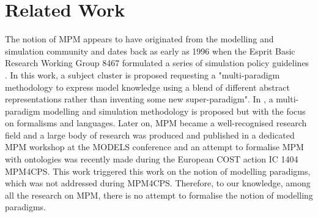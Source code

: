 \section{Related Work}
\label{sec:RelatedWork}

The notion of MPM appears to have originated from the modelling and simulation community and dates back as early as 1996 when the Esprit Basic Research Working Group 8467 formulated a series of simulation policy guidelines \cite{Vangheluwe-VansteenkisteKerckhoffs-1996}. In this work, a subject cluster is proposed requesting a "multi-paradigm methodology to express model knowledge using a blend of different abstract representations rather than inventing some new super-paradigm". In \cite{Vangheluwe-Vansteenkiste1996}, a multi-paradigm modelling and simulation methodology is proposed but with the focus on formalisms and languages. Later on, MPM became a well-recognised research field and a large body of research was produced and published in a dedicated MPM workshop at the MODELS conference and an attempt to formalise MPM with ontologies was recently made during the European COST action IC 1404 MPM4CPS. This work triggered this work on the notion of modelling paradigms, which was not addressed during MPM4CPS. Therefore, to our knowledge, among all the research on MPM, there is no attempt to formalise the notion of modelling paradigms.